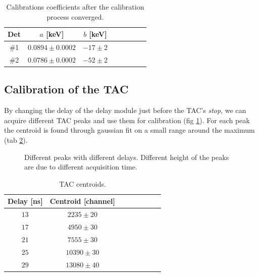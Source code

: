 \documentclass[11pt,a4 paper]{article}
\begin{document}
\begin{table}[H]
  \centering
  \begin{tabular}{cccccccc}
    \toprule
    Det & $a$ [keV] & $b$ [keV] \\
    \midrule
    \#1 & $0.0894 \pm 0.0002$ & $-17 \pm 2$ \\
    \#2 & $0.0786 \pm 0.0002$ & $-52 \pm 2$ \\
    \bottomrule
  \end{tabular}
  \caption{Calibrations coefficients after the calibration process converged.}
  \label{tab:calibr:coeffs}
\end{table}

\subsection{Calibration of the TAC}

By changing the delay of the delay module just before the TAC's \emph{stop}, we can acquire different TAC peaks and use them for calibration (fig \ref{fig:tac:calibr}).
For each peak the centroid is found through gaussian fit on a small range around the maximum (tab \ref{tab:tac:calibr}).

\begin{figure}[H]
    \centering
    \caption{Different peaks with different delays. Different height of the peaks are due to different acquisition time.}
    \label{fig:tac:calibr}
\end{figure}

\begin{table}[H]
    \centering
    \begin{tabular}{cccccccc}
        \toprule
        Delay [ns] & Centroid [channel] \\
        \midrule
        $13$ & $2235\pm 20$ \\
        $17$ & $4950\pm 30$ \\
        $21$ & $7555\pm 30$ \\
        $25$ & $10390\pm 30$ \\
        $29$ & $13080\pm 40$ \\
        \bottomrule
    \end{tabular}
    \caption{TAC centroids.}
    \label{tab:tac:calibr}
\end{table}
\end{document}
